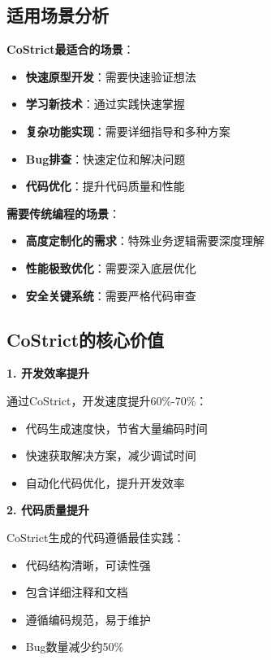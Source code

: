 \documentclass[12pt,a4paper]{article}
\begin{document}
\begin{itemize}
\subsection{适用场景分析}

\textbf{CoStrict最适合的场景}：

\begin{itemize}
    \item \textbf{快速原型开发}：需要快速验证想法
    \item \textbf{学习新技术}：通过实践快速掌握
    \item \textbf{复杂功能实现}：需要详细指导和多种方案
    \item \textbf{Bug排查}：快速定位和解决问题
    \item \textbf{代码优化}：提升代码质量和性能
\end{itemize}

\textbf{需要传统编程的场景}：

\begin{itemize}
    \item \textbf{高度定制化的需求}：特殊业务逻辑需要深度理解
    \item \textbf{性能极致优化}：需要深入底层优化
    \item \textbf{安全关键系统}：需要严格代码审查
\end{itemize}

\subsection{CoStrict的核心价值}

\textbf{1. 开发效率提升}

通过CoStrict，开发速度提升60\%-70\%：

\begin{itemize}
    \item 代码生成速度快，节省大量编码时间
    \item 快速获取解决方案，减少调试时间
    \item 自动化代码优化，提升开发效率
\end{itemize}

\textbf{2. 代码质量提升}

CoStrict生成的代码遵循最佳实践：

\begin{itemize}
    \item 代码结构清晰，可读性强
    \item 包含详细注释和文档
    \item 遵循编码规范，易于维护
    \item Bug数量减少约50\%
\end{itemize}


\end{itemize}
\end{document}
